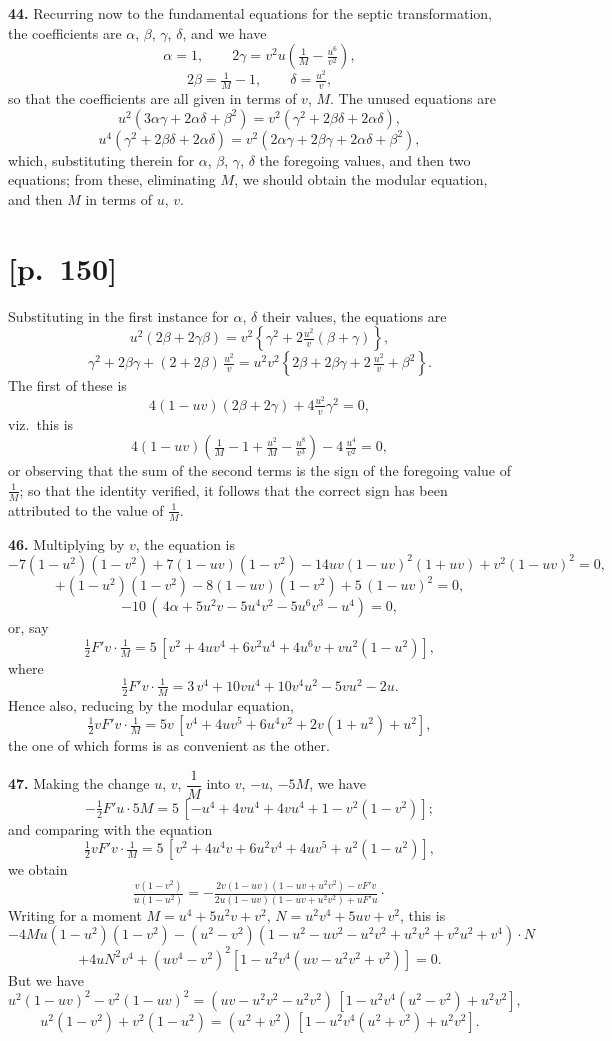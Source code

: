 \documentclass[11pt]{article}
\begin{document}
\medskip
\noindent\textbf{44.} Recurring now to the fundamental equations for the septic transformation, the
coefficients are $\alpha$, $\beta$, $\gamma$, $\delta$, and we have
\[
\alpha=1,\qquad 2\gamma=v^2u\!\left(\tfrac{1}{M}-\tfrac{u^6}{v^2}\right)\!,
\]
\[
2\beta=\tfrac{1}{M}-1,\qquad \delta=\tfrac{u^2}{v},
\]
so that the coefficients are all given in terms of $v$, $M$. The unused equations are
\[
u^2(3\alpha\gamma+2\alpha\delta+\beta^2)=v^2(\gamma^2+2\beta\delta+2\alpha\delta),
\]
\[
u^4(\gamma^2+2\beta\delta+2\alpha\delta)=v^2(2\alpha\gamma+2\beta\gamma+2\alpha\delta+\beta^2),
\]
which, substituting therein for $\alpha$, $\beta$, $\gamma$, $\delta$ the foregoing values, and then two equations;
from these, eliminating $M$, we should obtain the modular equation, and then $M$ in
terms of $u$, $v$.

\section*{[p.~150]}
Substituting in the first instance for $\alpha$, $\delta$ their values, the equations are
\[
u^2(2\beta+2\gamma\beta)=v^2\!\left\{\gamma^2+2\tfrac{u^2}{v}(\beta+\gamma)\right\}\!,
\]
\[
\gamma^2+2\beta\gamma+(2+2\beta)\,\tfrac{u^2}{v}=u^2v^2\!\left\{2\beta+2\beta\gamma+2\,\tfrac{u^2}{v}+\beta^2\right\}\!.
\]
The first of these is
\[
4(1-uv)(2\beta+2\gamma)+4\tfrac{u^2}{v}\gamma^2=0,
\]
viz.\ this is
\[
4(1-uv)\!\left(\tfrac{1}{M}-1+\tfrac{u^2}{M}-\tfrac{u^8}{v^3}\right)\!-4\,\tfrac{u^4}{v^2}=0,
\]
or observing that the sum of the second terms is the sign of the foregoing value
of $\tfrac{1}{M}$; so that the identity verified, it follows that the correct sign has been
attributed to the value of $\tfrac{1}{M}$.

\medskip
\noindent\textbf{46.} Multiplying by $v$, the equation is
\[
-7(1-u^2)(1-v^2)+7(1-uv)(1-v^2)-14uv(1-uv)^2(1+uv)+v^2(1-uv)^2=0,
\]
\[
+(1-u^2)(1-v^2)-8(1-uv)(1-v^2)+5\,(1-uv)^2=0,
\]
\[
-10\,(\,4\alpha+5u^2v-5u^4v^2-5u^6v^3-u^4)=0,
\]
or, say
\[
\tfrac{1}{2}F'v\cdot\tfrac{1}{M}=5\,[v^2+4uv^4+6v^2u^4+4u^6v+vu^2(1-u^2)],
\]
where
\[
\tfrac{1}{2}F'v\cdot\tfrac{1}{M}=3\,v^4+10vu^4+10v^4u^2-5vu^2-2u.
\]
Hence also, reducing by the modular equation,
\[
\tfrac{1}{2}vF'v\cdot\tfrac{1}{M}=5v\,[v^4+4uv^5+6u^4v^2+2v(1+u^2)+u^2],
\]
the one of which forms is as convenient as the other.

\medskip
\noindent\textbf{47.} Making the change $u$, $v$, $\dfrac{1}{M}$ into $v$, $-u$, $-5M$, we have
\[
-\tfrac{1}{2}F'u\cdot 5M=5\,[-u^4+4vu^4+4vu^4+1-v^2(1-v^2)];
\]
and comparing with the equation
\[
\tfrac{1}{2}vF'v\cdot\tfrac{1}{M}=5\,[v^2+4u^4v+6u^2v^4+4uv^5+u^2(1-u^2)],
\]
we obtain
\[
\tfrac{v(1-v^2)}{u(1-u^2)}=-\tfrac{2v(1-uv)(1-uv+u^2v^2)-vF'v}{2u(1-uv)(1-uv+u^2v^2)+uF'u}\cdot
\]
Writing for a moment $M=u^4+5u^2v+v^2$, $N=u^2v^4+5uv+v^2$, this is
\[
-4Mu(1-u^2)(1-v^2)-(u^2-v^2)(1-u^2-uv^2-u^2v^2+u^2v^2+v^2u^2+v^4)\!\cdot N
\]
\[
+4uN^2v^4+(uv^4-v^2)^2[1-u^2v^4(uv-u^2v^2+v^2)]=0.
\]
But we have
\[
u^2(1-uv)^2-v^2(1-uv)^2=(uv-u^2v^2-u^2v^2)\,[1-u^2v^4(u^2-v^2)+u^2v^2],
\]
\[
u^2(1-v^2)+v^2(1-u^2)=(u^2+v^2)\,[1-u^2v^4(u^2+v^2)+u^2v^2].
\]
\end{document}
